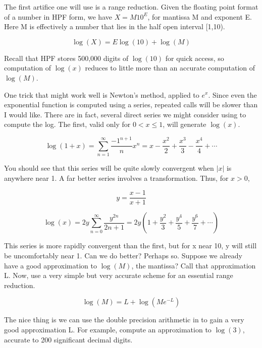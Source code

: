 \documentclass[a4paper,12pt]{article}
\begin{document}
The first artifice one will use is a range reduction. Given the floating point format of a number in HPF form, we have $X = M 10^E$, for mantissa M and exponent E. Here M is effectively a number that lies in the half open interval [1,10).

\begin{equation}
   \log(X) = E \log(10) + \log(M)
\end{equation}

Recall that HPF stores 500,000 digits of $\log(10)$ for quick access, so computation of $\log(x)$ reduces to little more than an accurate computation of $\log(M)$.

One trick that might work well is Newton's method, applied to $e^x$. Since even the exponential function is computed using a series, repeated calls will be slower than I would like. There are in fact, several direct series we might consider using to compute the log. The first, valid only for $0 < x \le 1$, will generate $\log(x)$.

\begin{equation}
   \log(1+x) =  \sum_{n = 1}^{\infty}{\frac{-1^{n+1}}{n}}x^n = x - \frac{x^2}{2} + \frac{x^3}{3} - \frac{x^4}{4} + \cdots
\end{equation}

You should see that this series will be quite slowly convergent when $|x|$ is anywhere near 1. A far better series involves a transformation. Thus, for $x > 0$,

\begin{equation}
   y = \frac{x - 1}{x+1}
\end{equation}

\begin{equation}
   \log(x) =  2y\sum_{n = 0}^{\infty}{\frac{y^{2n}}{2n+1}} = 2y(1 + \frac{y^2}{3} + \frac{y^4}{5} + \frac{y^6}{7} + \cdots )
\end{equation}

This series is more rapidly convergent than the first, but for x near 10, y will still be uncomfortably near 1. Can we do better? Perhaps so. Suppose we already have a good approximation to $\log(M)$, the mantissa? Call that approximation L. Now, use a very simple but very accurate scheme for an essential range reduction.

\begin{equation}
   \log(M) = L + \log(M e^{-L})
\end{equation}

The nice thing is we can use the double precision arithmetic in \Ml to gain a very good approximation L. For example, compute an approximation to $\log(3)$, accurate to 200 significant decimal digits.
\end{document}
